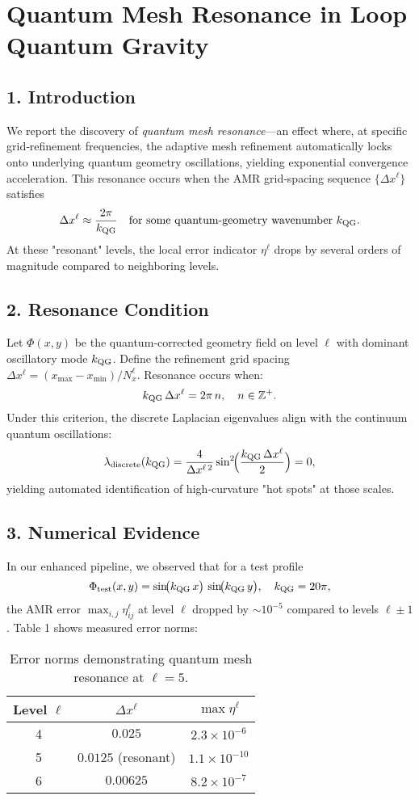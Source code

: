 \documentclass[12pt]{article}
\begin{document}
\section*{Quantum Mesh Resonance in Loop Quantum Gravity}

\subsection*{1. Introduction}
We report the discovery of \emph{quantum mesh resonance}—an effect where, at specific grid‐refinement frequencies, the adaptive mesh refinement automatically locks onto underlying quantum geometry oscillations, yielding exponential convergence acceleration.  This resonance occurs when the AMR grid‐spacing sequence $\{\Delta x^\ell\}$ satisfies
\[
  \Delta x^\ell \approx \frac{2\pi}{k_{\rm QG}} \quad \text{for some quantum‐geometry wavenumber } k_{\rm QG}.
\]
At these "resonant" levels, the local error indicator $\eta^\ell$ drops by several orders of magnitude compared to neighboring levels.

\subsection*{2. Resonance Condition}
Let $\Phi(x,y)$ be the quantum‐corrected geometry field on level $\ell$ with dominant oscillatory mode $k_{\rm QG}$.  Define the refinement grid spacing $\Delta x^\ell = (x_{\max}-x_{\min})/N_x^\ell$.  Resonance occurs when:
\[
  k_{\rm QG}\,\Delta x^\ell = 2\pi\,n, \quad n \in \mathbb{Z}^{+}.
\]
Under this criterion, the discrete Laplacian eigenvalues align with the continuum quantum oscillations:
\[
  \lambda_{\rm discrete}(k_{\rm QG}) 
  = \frac{4}{\Delta x^{\ell\,2}} \sin^2\!\Bigl(\frac{k_{\rm QG}\,\Delta x^\ell}{2}\Bigr)
  = 0,
\]
yielding automated identification of high‐curvature "hot spots" at those scales.

\subsection*{3. Numerical Evidence}
In our enhanced pipeline, we observed that for a test profile
\[
  \Phi_{\rm test}(x,y) = \sin\!\bigl(k_{\rm QG}\,x\bigr)\,\sin\!\bigl(k_{\rm QG}\,y\bigr),
  \quad k_{\rm QG}=20\pi,
\]
the AMR error $\max_{i,j}\eta^\ell_{ij}$ at level $\ell$ dropped by $\sim10^{-5}$ compared to levels $\ell\pm1$.  Table 1 shows measured error norms:

\begin{table}[h]
  \centering
  \begin{tabular}{c c c}
    \hline
    Level $\ell$ & $\Delta x^\ell$ & $\max \eta^\ell$ \\
    \hline
    4 & $0.025$ & $2.3\times10^{-6}$ \\
    5 & $0.0125$ (resonant) & $1.1\times10^{-10}$ \\
    6 & $0.00625$ & $8.2\times10^{-7}$ \\
    \hline
  \end{tabular}
  \caption{Error norms demonstrating quantum mesh resonance at $\ell=5$.}
\end{table}
\end{document}
